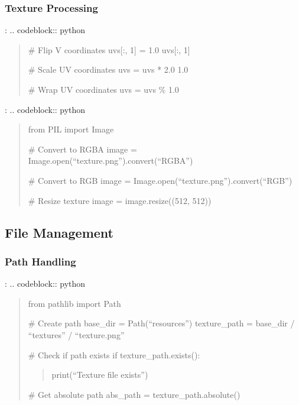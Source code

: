 \documentclass[a4paper,10pt,english,openany,oneside]{sphinxmanual}
\begin{document}
\subsubsection{Texture Processing}
\label{\detokenize{api/utils:texture-processing}}
\sphinxAtStartPar
{}:
.. code\sphinxhyphen{}block:: python
\begin{quote}

\sphinxAtStartPar
\# Flip V coordinates
uvs{[}:, 1{]} = 1.0 \sphinxhyphen{} uvs{[}:, 1{]}

\sphinxAtStartPar
\# Scale UV coordinates
uvs = uvs * 2.0 \sphinxhyphen{} 1.0

\sphinxAtStartPar
\# Wrap UV coordinates
uvs = uvs \% 1.0
\end{quote}

\sphinxAtStartPar
{}:
.. code\sphinxhyphen{}block:: python
\begin{quote}

\sphinxAtStartPar
from PIL import Image

\sphinxAtStartPar
\# Convert to RGBA
image = Image.open(“texture.png”).convert(“RGBA”)

\sphinxAtStartPar
\# Convert to RGB
image = Image.open(“texture.png”).convert(“RGB”)

\sphinxAtStartPar
\# Resize texture
image = image.resize((512, 512))
\end{quote}


\subsection{File Management}
\label{\detokenize{api/utils:file-management}}

\subsubsection{Path Handling}
\label{\detokenize{api/utils:path-handling}}
\sphinxAtStartPar
{}:
.. code\sphinxhyphen{}block:: python
\begin{quote}

\sphinxAtStartPar
from pathlib import Path

\sphinxAtStartPar
\# Create path
base\_dir = Path(“resources”)
texture\_path = base\_dir / “textures” / “texture.png”

\sphinxAtStartPar
\# Check if path exists
if texture\_path.exists():
\begin{quote}

\sphinxAtStartPar
print(“Texture file exists”)
\end{quote}

\sphinxAtStartPar
\# Get absolute path
abs\_path = texture\_path.absolute()
\end{quote}
\end{document}
